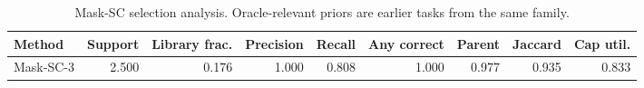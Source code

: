 \begin{table}[ht]
    \caption{Mask-SC selection analysis. Oracle-relevant priors are earlier tasks from the same family.}
    \label{tbl:masksc_selection}
    \centering
    \scriptsize
    \begin{tabular}{lrrrrrrrr}
    \toprule
Method & Support & Library frac. & Precision & Recall & Any correct & Parent & Jaccard & Cap util. \\
    \midrule
Mask-SC-3 & 2.500 & 0.176 & 1.000 & 0.808 & 1.000 & 0.977 & 0.935 & 0.833 \\
    \bottomrule
    \end{tabular}
\end{table}
